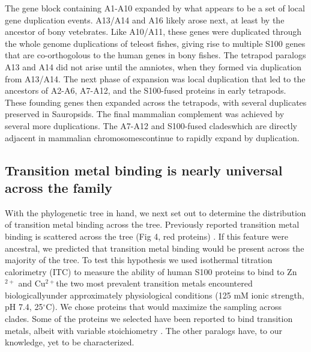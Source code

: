 The gene block containing A1-A10 expanded by what appears to be a
set of local gene duplication events. A13/A14 and A16 likely arose
next, at least by the ancestor of bony vetebrates. Like A10/A11, these
genes were duplicated through the whole genome duplications of teleost
fishes, giving rise to multiple S100 genes that are co-orthogolous
to the human genes in bony fishes. The tetrapod paralogs A13 and A14
did not arise until the amniotes, when they formed via duplication
from A13/A14. The next phase of expansion was local duplication that
led to the ancestors of A2-A6, A7-A12, and the S100-fused proteins
in early tetrapods. These founding genes then expanded across the
tetrapods, with several duplicates preserved in Sauropsids. The final
mammalian complement was achieved by several more duplications. The
A7-A12 and S100-fused clades\textemdash which are directly adjacent
in mammalian chromosomes\textemdash continue to rapidly expand by
duplication.

\subsection{Transition metal binding is nearly universal across the family}

With the phylogenetic tree in hand, we next set out to determine the
distribution of transition metal binding across the tree. Previously
reported transition metal binding is scattered across the tree (Fig
4, red proteins) \cite{moroz_role_2010,gilston_binding_2016}. If
this feature were ancestral, we predicted that transition metal binding
would be present across the majority of the tree. To test this hypothesis
we used isothermal titration calorimetry (ITC) to measure the ability
of human S100 proteins to bind to Zn$^{2+}$ and Cu$^{2+}$\textemdash the
two most prevalent transition metals encountered biologically\textemdash under
approximately physiological conditions (125 mM ionic strength, pH
7.4, 25$^{\circ}$C). We chose proteins that would maximize the sampling
across clades. Some of the proteins we selected have been reported
to bind transition metals, albeit with variable stoichiometry \cite{koch_implications_2007,tsvetkov_thermodynamics_2010}.
The other paralogs have, to our knowledge, yet to be characterized.

